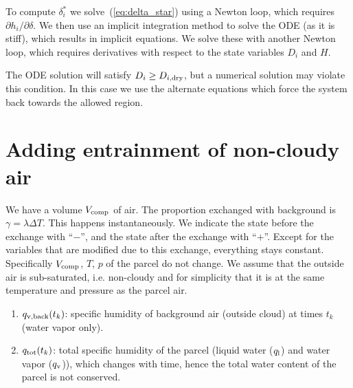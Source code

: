 \documentclass{article}
\begin{document}
To compute $\delta_i^*$ we solve~(\ref{eq:delta_star}) using a Newton
loop, which requires $\partial h_i/\partial \delta$. We then use an
implicit integration method to solve the ODE (as it is stiff), which
results in implicit equations. We solve these with another Newton
loop, which requires derivatives with respect to the state variables
$D_i$ and $H$.

The ODE solution will satisfy $D_i \ge D_{i,\rm dry}$, but a numerical
solution may violate this condition. In this case we use the alternate
equations which force the system back towards the allowed region.

\section{Adding entrainment of non-cloudy air}
We have a volume $V_{\rm comp}$ of air. The proportion exchanged with
background is $\gamma = \lambda\Delta T$. This happens
instantaneously. We indicate the state before the exchange with
``$-$'', and the state after the exchange with ``$+$''. Except for the
variables that are modified due to this exchange, everything stays
constant. Specifically $V_{\rm comp}$, $T$, $p$ of the parcel do not
change. We assume that the outside air is sub-saturated,
i.e. non-cloudy and for simplicity that it is at the same temperature
and pressure as the parcel air.


\begin{enumerate}
\item $q_{\rm v, back}(t_k)$: specific humidity of background air
  (outside cloud) at times $t_k$ (water vapor only).
\item $q_{\rm tot}(t_k)$: total specific humidity of the parcel
  (liquid water ($q_{\rm l}$) and water vapor ($q_{\rm v}$)), which
  changes with time, hence the total water content of the parcel is
  not conserved.
\end{enumerate}
\end{document}
